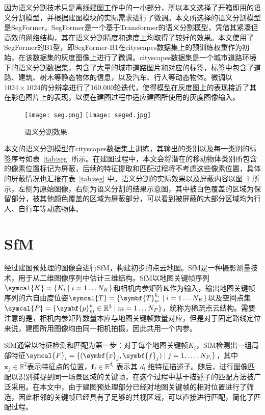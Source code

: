 因为语义分割技术只是离线建图工作中的一小部分，所以本文选择了开箱即用的语义分割模型，并根据建图模块的实际需求进行了微调。本文所选择的语义分割模型是SegFormer\cite{xie2021segformer}，SegFormer是一个基于Transformer的语义分割模型，凭借其紧凑但高效的网络结构，其在语义分割精度和速度上均取得了较好的效果。本文使用了SegFormer的B1型，即SegFormer-B1在cityscapes\cite{Cordts2016Cityscapes}数据集上的预训练权重作为初始，在该数据集的灰度图像上进行了微调。cityscapes数据集是一个城市道路环境下的语义分割数据集，包含了大量的城市道路图片和对应的标签，标签中包含了道路、建筑、树木等静态物体的信息，以及汽车、行人等动态物体。微调以$1024 \times 1024$的分辨率进行了160,000轮迭代，使得模型在灰度图上的表现接近了其在彩色图片上的表现，以便在建图过程中适应建图所使用的灰度图像输入。

\begin{figure}
  \centering
  \texttt{[image: seg.png]}
  \texttt{[image: seged.jpg]}
  \caption{语义分割效果}
  \label{fig:seg}
\end{figure}

本文的语义分割模型在cityscapes数据集上训练，其输出的类别以及每一类别的标签序号如表~\ref{tab:seg} 所示。在建图过程中，本文会将潜在的移动物体类别所包含的像素位置标记为屏蔽，后续的特征提取和匹配过程将不考虑这些像素位置，具体的屏蔽情况也汇报在表~\ref{tab:seg} 中。语义分割的实际效果以及屏蔽内容以图~\ref{fig:seg} 所示，左侧为原始图像，右侧为语义分割的结果示意图，其中被白色覆盖的区域为保留部分，被其他颜色覆盖的区域为屏蔽部分，可以看到被屏蔽的大部分区域均为行人、自行车等动态物体。

\section{SfM}

经过建图预处理的图像会进行SfM，构建初步的点云地图。SfM是一种摄影测量技术，用于从二维图像序列中估计三维结构\cite{schonberger2016structure}。SfM以地图关键帧序列$\symcal{K} = \{K_i \mid i=1 \ldots N_{K} \}$和相机内参矩阵$\symbf{K}$作为输入，输出地图关键帧序列的六自由度位姿$\symcal{T} = \{\symbf{T}^{k_i}_w \mid i=1 \ldots N_K \}$以及空间点集$\symcal{P} = \{\symbf{p}_{m}^{w} \in \mathbb{R}^3 \mid m=1 \ldots N_P\}$，统称为稀疏点云结构。需要注意的是，相机内参矩阵数量本应与地图关键帧数量对应，但是对于固定路线定位来说，建图所用图像均由同一相机拍摄，因此共用一个内参。

SfM通常以特征检测和匹配为第一步：对于每个地图关键帧$K_i$，SfM检测出一组局部特征$\symcal{F}_i = \{(\symbf{x}_j, \symbf{f}_j) \mid j = 1, \ldots, N_{F_i}\}$，其中 $\symbf{x}_j \in \mathbb{R}^2$表示特征点的位置，$\symbf{f}_j \in \mathbb{R}^{d_l}$ 表示其 ${d_l}$ 维特征描述子。随后，进行图像匹配以识别捕捉到同一场景区域的关键帧，在这个过程中基于描述子的匹配方法被广泛采用。在本文中，由于建图预处理部分已经对地图关键帧的相对位置进行了筛选，因此相邻的关键帧已经具有了足够的共视区域，可以直接进行匹配，简化了匹配过程。

